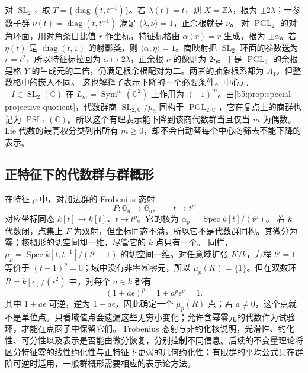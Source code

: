 \ProseParagraphBreak
对 \(\operatorname{SL}_2\)，取 \(T=\bigl\{\operatorname{diag}(t,t^{-1})\bigr\}\)。若 \(\lambda(t)=t\)，则 \(X=\mathbb Z\lambda\)，根为 \(\pm2\lambda\)；一参数子群 \(\nu(t)=\operatorname{diag}(t,t^{-1})\) 满足 \(\langle\lambda,\nu\rangle=1\)，正余根就是 \(\nu\)。 对 \(\operatorname{PGL}_2\) 的对角环面，用对角条目比值 \(r\) 作坐标，特征标格由 \(\alpha(r)=r\) 生成，根为 \(\pm\alpha\)。若 \(\eta(t)\) 是 \(\operatorname{diag}(t,1)\) 的射影类，则 \(\langle\alpha,\eta\rangle=1\)。商映射把 \(\operatorname{SL}_2\) 环面的参数送为 \(r=t^2\)，所以特征标拉回为 \(\alpha\mapsto2\lambda\)，正余根 \(\nu\) 的像则为 \(2\eta\)。于是 \(\operatorname{PGL}_2\) 的余根是格 \(Y\) 的生成元的二倍，仍满足根余根配对为二。两者的抽象根系都为 \(A_1\)，但整数格中的嵌入不同。
\ProseParagraphBreak
这也解释了表示下降的一个必要条件。中心元 \(-I\in\operatorname{SL}_2(\mathbb C)\) 在 \(L_m=\operatorname{Sym}^m(\mathbb C^2)\) 上作用为 \((-1)^m\)。由\cref{b5:prop:special-projective-quotient}，代数群商 \(\operatorname{SL}_{2,\mathbb C}/\mu_2\) 同构于 \(\operatorname{PGL}_{2,\mathbb C}\)，它在复点上的商群也记为 \(\operatorname{PSL}_2(\mathbb C)\)。所以这个有理表示能下降到该商代数群当且仅当 \(m\) 为偶数。Lie 代数的最高权分类列出所有 \(m\ge0\)，却不会自动替每个中心商筛去不能下降的表示。

\subsection{正特征下的代数群与群概形}
\label{b5:subsec:2104:03}

在特征 \(p\) 中，对加法群的 Frobenius 态射
\[
	F:\mathbb G_a\longrightarrow\mathbb G_a,\qquad t\longmapsto t^p
\]
对应坐标同态 \(k[t]\to k[t]\)、\(t\mapsto t^p\)。它的核为 \(\alpha_p=\operatorname{Spec}k[t]/(t^p)\)。
若 \(k\) 代数闭，点集上 \(F\) 为双射，但坐标同态不满，所以它不是代数群同构。其微分为零；核概形的切空间却一维，尽管它的 \(k\) 点只有一个。
\ProseParagraphBreak
同样，\(\mu_p=\operatorname{Spec}k[t,t^{-1}]/(t^p-1)\) 的切空间一维。对任意域扩张 \(K/k\)，方程 \(t^p=1\) 等价于 \((t-1)^p=0\)；域中没有非零幂零元，所以 \(\mu_p(K)=\{1\}\)。但在双数环 \(R=k[\epsilon]/(\epsilon^2)\) 中，对每个 \(a\in k\) 都有
\[
	(1+a\epsilon)^p=1+a^p\epsilon^p=1.
\]
其中 \(1+a\epsilon\) 可逆，逆为 \(1-a\epsilon\)，因此确定一个 \(\mu_p(R)\) 点；若 \(a\ne0\)，这个点就不是单位点。只看域值点会遗漏这些无穷小变化；允许含幂零元的代数作为试验环，才能在点函子中保留它们。
\ProseParagraphBreak
Frobenius 态射与非约化核说明，光滑性、约化性、可分性以及表示是否能由微分恢复，分别控制不同信息。后续的不变量理论将区分特征零的线性约化性与正特征下更弱的几何约化性；有限群的平均公式只在群阶可逆时适用，一般群概形需要相应的表示论方法。
